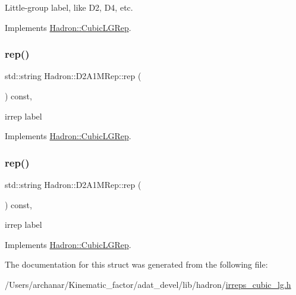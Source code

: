 Little-\/group label, like D2, D4, etc. 

Implements \mbox{\hyperlink{structHadron_1_1CubicLGRep_a9bdb14b519a611d21379ed96a3a9eb41}{Hadron\+::\+Cubic\+L\+G\+Rep}}.

\mbox{\label{structHadron_1_1D2A1MRep_ae86f915110783280c85121414a31e18f}} 
\subsubsection{\texorpdfstring{rep()}{rep()}\hspace{0.1cm}{\footnotesize\ttfamily [1/2]}}
{\footnotesize\ttfamily std\+::string Hadron\+::\+D2\+A1\+M\+Rep\+::rep (\begin{DoxyParamCaption}{ }\end{DoxyParamCaption}) const\hspace{0.3cm}{\ttfamily [inline]}, {\ttfamily [virtual]}}

irrep label 

Implements \mbox{\hyperlink{structHadron_1_1CubicLGRep_a50f5ddbb8f4be4cee0106fa9e8c75e6c}{Hadron\+::\+Cubic\+L\+G\+Rep}}.

\mbox{\label{structHadron_1_1D2A1MRep_ae86f915110783280c85121414a31e18f}} 
\subsubsection{\texorpdfstring{rep()}{rep()}\hspace{0.1cm}{\footnotesize\ttfamily [2/2]}}
{\footnotesize\ttfamily std\+::string Hadron\+::\+D2\+A1\+M\+Rep\+::rep (\begin{DoxyParamCaption}{ }\end{DoxyParamCaption}) const\hspace{0.3cm}{\ttfamily [inline]}, {\ttfamily [virtual]}}

irrep label 

Implements \mbox{\hyperlink{structHadron_1_1CubicLGRep_a50f5ddbb8f4be4cee0106fa9e8c75e6c}{Hadron\+::\+Cubic\+L\+G\+Rep}}.



The documentation for this struct was generated from the following file\+:\begin{DoxyCompactItemize}
\item 
/\+Users/archanar/\+Kinematic\+\_\+factor/adat\+\_\+devel/lib/hadron/\mbox{\hyperlink{lib_2hadron_2irreps__cubic__lg_8h}{irreps\+\_\+cubic\+\_\+lg.\+h}}\end{DoxyCompactItemize}
